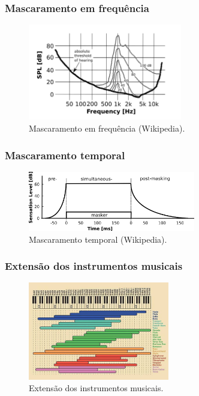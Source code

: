 \begin{frame}[allowframebreaks]
  \frametitle{Mascaramento em frequência}
  \begin{figure}[h]
  \centering
  \includegraphics[width=0.6\textwidth]{images/masking.png}
  \caption{Mascaramento em frequência (Wikipedia).}
  \label{fig-masking}
  \end{figure}
\end{frame}

\begin{frame}[allowframebreaks]
  \frametitle{Mascaramento temporal}
  \begin{figure}[h]
  \centering
  \includegraphics[width=0.65\textwidth]{images/timemasking.png}
  \caption{Mascaramento temporal (Wikipedia).}
  \label{fig-timemasking}
  \end{figure}
\end{frame}


\begin{frame}[allowframebreaks]
  \frametitle{Extensão dos instrumentos musicais}

  \begin{figure}[h]
  \centering
  \includegraphics[width=0.55\textwidth]{images/strumenti-musicale.jpg}
  \caption{Extensão dos instrumentos musicais.}
  \label{fig-strumenti-musicale}
  \end{figure}

\end{frame}

